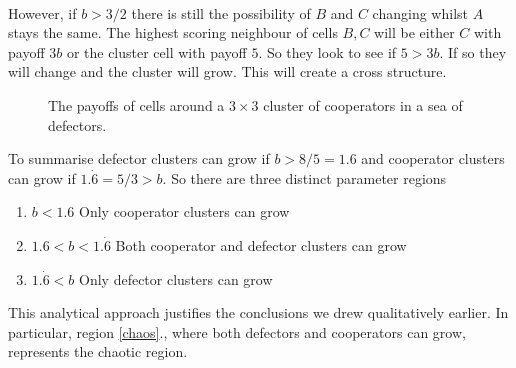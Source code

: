 \\
However, if $b>3/2$ there is still the possibility of $B$ and $C$ changing whilst $A$ stays the same. The highest scoring neighbour of cells $B,C$ will be either $C$ with payoff $3b$ or the cluster cell with payoff $5$. So they look to see if $5>3b$. If so they will change and the cluster will grow. This will create a cross structure.
\begin{figure}[h]
	\centering
	\caption{The payoffs of cells around a $3\times3$ cluster of cooperators in a sea of defectors.}
	\label{fig:p-d-graph}
\end{figure}
To summarise defector clusters can grow if $b>8/5=1.6$ and cooperator clusters can grow if $1.\dot6=5/3>b$. So there are three distinct parameter regions
\begin{enumerate}
	\item $b<1.6$ Only cooperator clusters can grow
	\item $1.6<b<1.\dot6$ Both cooperator and defector clusters can grow\label{chaos}
	\item $1.\dot 6<b$ Only defector clusters can grow
\end{enumerate}
This analytical approach justifies the conclusions we drew qualitatively earlier. In particular, region \ref{chaos}., where both defectors and cooperators can grow, represents the chaotic region.
